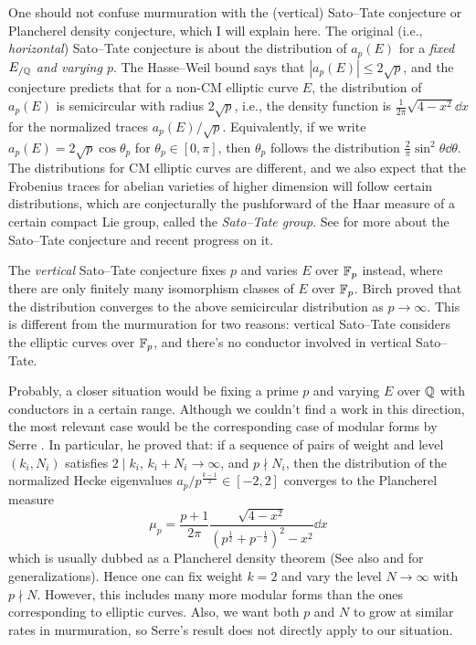 One should not confuse murmuration with the (vertical) Sato--Tate conjecture or Plancherel density conjecture, which I will explain here.
The original (i.e., \emph{horizontal}) Sato--Tate conjecture is about the distribution of $a_p(E)$ for a \emph{fixed $E_{/\mathbb{Q}}$ and varying $p$}.
The Hasse--Weil bound says that $|a_p(E)| \le 2 \sqrt{p}$, and the conjecture predicts that for a non-CM elliptic curve $E$, the distribution of $a_p(E)$ is semicircular with radius $2\sqrt{p}$, i.e., the density function is $\frac{1}{2\pi}\sqrt{4 - x^2} \dd x$ for the normalized traces $a_p(E)/\sqrt{p}$.
Equivalently, if we write $a_p(E) = 2 \sqrt{p} \cos \theta_p$ for $\theta_p \in [0, \pi]$, then $\theta_p$ follows the distribution $\frac{2}{\pi} \sin^2 \theta \dd \theta$.
The distributions for CM elliptic curves are different, and we also expect that the Frobenius traces for abelian varieties of higher dimension will follow certain distributions, which are conjecturally the pushforward of the Haar measure of a certain compact Lie group, called the \emph{Sato--Tate group}.
See \cite{sutherland2019sato} for more about the Sato--Tate conjecture and recent progress on it.


The \emph{vertical} Sato--Tate conjecture fixes $p$ and varies $E$ over $\mathbb{F}_p$ instead, where there are only finitely many isomorphism classes of $E$ over $\mathbb{F}_p$.
Birch \cite{birch1968number} proved that the distribution converges to the above semicircular distribution as $p \to \infty$.
This is different from the murmuration for two reasons: vertical Sato--Tate considers the elliptic curves over $\mathbb{F}_p$, and there's no conductor involved in vertical Sato--Tate.

Probably, a closer situation would be fixing a prime $p$ and varying $E$ over $\mathbb{Q}$ with conductors in a certain range.
Although we couldn't find a work in this direction, the most relevant case would be the corresponding case of modular forms by Serre \cite{serre1997repartition}.
In particular, he proved that: if a sequence of pairs of weight and level $(k_i, N_i)$ satisfies $2 \mid k_i$, $k_i + N_i \to \infty$, and $p \nmid N_i$, then the distribution of the normalized Hecke eigenvalues $a_p / p^{\frac{k-1}{2}} \in [-2, 2]$ converges to the Plancherel measure
\[
\mu_p = \frac{p+1}{2\pi} \frac{\sqrt{4 - x^2}}{(p^{\frac{1}{2}} + p^{-\frac{1}{2}})^2 - x^2} \dd x
\]
which is usually dubbed as a Plancherel density theorem (See also \cite{shin2012automorphic} and \cite{shin2016sato} for generalizations).
Hence one can fix weight $k = 2$ and vary the level $N \to \infty$ with $p \nmid N$.
However, this includes many more modular forms than the ones corresponding to elliptic curves.
Also, we want both $p$ and $N$ to grow at similar rates in murmuration, so Serre's result does not directly apply to our situation.
